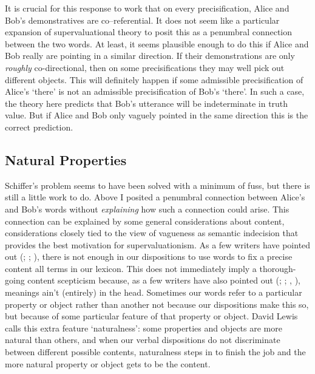 \documentclass[
  11pt,
  letterpaper,
  DIV=11,
  numbers=noendperiod,
  oneside]{scrartcl}
\begin{document}
It is crucial for this response to work that on every precisification,
Alice and Bob's demonstratives are co--referential. It does not seem
like a particular expansion of supervaluational theory to posit this as
a penumbral connection between the two words. At least, it seems
plausible enough to do this if Alice and Bob really are pointing in a
similar direction. If their demonstrations are only \emph{roughly}
co-directional, then on some precisifications they may well pick out
different objects. This will definitely happen if some admissible
precisification of Alice's `there' is not an admissible precisification
of Bob's `there'. In such a case, the theory here predicts that Bob's
utterance will be indeterminate in truth value. But if Alice and Bob
only vaguely pointed in the same direction this is the correct
prediction.

\subsection{Natural Properties}\label{natural-properties}

Schiffer's problem seems to have been solved with a minimum of fuss, but
there is still a little work to do. Above I posited a penumbral
connection between Alice's and Bob's words without \emph{explaining} how
such a connection could arise. This connection can be explained by some
general considerations about content, considerations closely tied to the
view of vagueness as semantic indecision that provides the best
motivation for supervaluationism. As a few writers have pointed out
(; ; ), there is not enough in
our dispositions to use words to fix a precise content all terms in our
lexicon. This does not immediately imply a thorough-going content
scepticism because, as a few writers have also pointed out
(;
; , ), meanings ain't (entirely) in
the head. Sometimes our words refer to a particular property or object
rather than another not because our dispositions make this so, but
because of some particular feature of that property or object. David
Lewis calls this extra feature `naturalness': some properties and
objects are more natural than others, and when our verbal dispositions
do not discriminate between different possible contents, naturalness
steps in to finish the job and the more natural property or object gets
to be the content.
\end{document}
